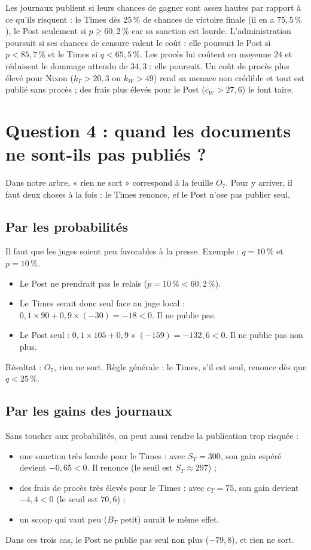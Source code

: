 \documentclass[11pt,a4paper]{article}
\theoremstyle{definition}
\begin{document}
\begin{reponse}
Les journaux publient si leurs chances de gagner sont assez hautes par rapport à ce qu'ils risquent : le Times dès $25\,\%$ de chances de victoire finale (il en a $75,5\,\%$), le Post seulement si $p\ge60,2\,\%$ car sa sanction est lourde. L'administration poursuit si ses chances de censure valent le coût : elle poursuit le Post si $p<85,7\,\%$ et le Times si $q<65,5\,\%$. Les procès lui coûtent en moyenne $24$ et réduisent le dommage attendu de $34,3$ : elle poursuit. Un coût de procès plus élevé pour Nixon ($k_T>20,3$ ou $k_W>49$) rend sa menace non crédible et tout est publié sans procès ; des frais plus élevés pour le Post ($c_W>27,6$) le font taire.
\end{reponse}

\section{Question 4 : quand les documents ne sont-ils pas publiés ?}

Dans notre arbre, « rien ne sort » correspond à la feuille $O_7$. Pour y arriver, il faut deux choses à la fois : le Times renonce, \emph{et} le Post n'ose pas publier seul.

\subsection{Par les probabilités}
Il faut que les juges soient peu favorables à la presse. Exemple : $q=10\,\%$ et $p=10\,\%$.
\begin{itemize}[leftmargin=*,itemsep=1pt]
\item Le Post ne prendrait pas le relais ($p=10\,\%<60,2\,\%$).
\item Le Times serait donc seul face au juge local : $0,1\times90+0,9\times(-30)=-18<0$. Il ne publie pas.
\item Le Post seul : $0,1\times105+0,9\times(-159)=-132,6<0$. Il ne publie pas non plus.
\end{itemize}
Résultat : $O_7$, rien ne sort. Règle générale : le Times, s'il est seul, renonce dès que $q<25\,\%$.

\subsection{Par les gains des journaux}
Sans toucher aux probabilités, on peut aussi rendre la publication trop risquée :
\begin{itemize}[leftmargin=*,itemsep=1pt]
\item une sanction très lourde pour le Times : avec $S_T=300$, son gain espéré devient $-0,65<0$. Il renonce (le seuil est $S_T\approx297$) ;
\item des frais de procès très élevés pour le Times : avec $c_T=75$, son gain devient $-4,4<0$ (le seuil est $70,6$) ;
\item un scoop qui vaut peu ($B_T$ petit) aurait le même effet.
\end{itemize}
Dans ces trois cas, le Post ne publie pas seul non plus ($-79,8$), et rien ne sort.
\end{document}
